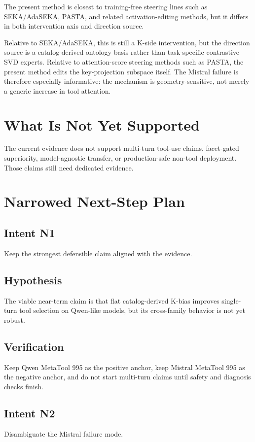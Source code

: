 \documentclass[11pt,a4paper]{article}
\begin{document}
The present method is closest to training-free steering lines such as
SEKA/AdaSEKA, PASTA, and related activation-editing methods, but it differs in
both intervention axis and direction source.

Relative to SEKA/AdaSEKA, this is still a K-side intervention, but the
direction source is a catalog-derived ontology basis rather than task-specific
contrastive SVD experts. Relative to attention-score steering methods such as
PASTA, the present method edits the key-projection subspace itself. The Mistral
failure is therefore especially informative: the mechanism is geometry-sensitive,
not merely a generic increase in tool attention.

\section{What Is Not Yet Supported}

The current evidence does not support multi-turn tool-use claims, facet-gated
superiority, model-agnostic transfer, or production-safe non-tool deployment.
Those claims still need dedicated evidence.

\section{Narrowed Next-Step Plan}

\subsection*{Intent N1}
Keep the strongest defensible claim aligned with the evidence.

\subsection*{Hypothesis}
The viable near-term claim is that flat catalog-derived K-bias improves
single-turn tool selection on Qwen-like models, but its cross-family behavior
is not yet robust.

\subsection*{Verification}
Keep Qwen MetaTool 995 as the positive anchor, keep Mistral MetaTool 995 as the
negative anchor, and do not start multi-turn claims until safety and diagnosis
checks finish.

\subsection*{Intent N2}
Disambiguate the Mistral failure mode.
\end{document}
